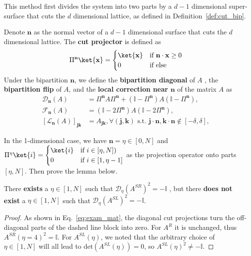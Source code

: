  This method first divides the system into two parts by a $d-1$ dimensional super-surface that cuts the $d$ dimensional lattice, as defined in Definition~\ref{def:cut_bip}.
 \begin{definition}
 \label{def:cut_bip}
      Denote $\mathbf{n}$ as the normal vector of a $d-1$ dimensional surface that cuts the $d$ dimensional lattice. 
      The \textbf{cut projector} is defined as
\begin{align}
    \Pi^{\mathbf{n}}\ket{\mathbf{x}} = \begin{cases}\ket{\mathbf{x}}&\text{if~} \mathbf n \cdot \mathbf x \geq0 \\ 0  &\text{if else} \end{cases}
\end{align}
Under the bipartition $\mathbf{n}$, we define the \textbf{bipartition diagonal} of $A$ , the \textbf{bipartition flip} of $A$, and the \textbf{local correction near $\mathbf{n}$ }of the matrix $A$ as
\begin{align}
    \mathcal{D}_{\mathbf{n}}(A) &= \Pi^{\mathbf{n} }A \Pi^{\mathbf{n} }+ (\mathbb I - \Pi^{\mathbf{n} })A(\mathbb{I} - \Pi^{\mathbf{n} }) ,\\
    \mathcal{F}_{\mathbf{n}}(A) &=  (\mathbb I - 2\Pi^{\mathbf{n} })A(\mathbb{I} - 2\Pi^{\mathbf{n} }) ,\\
     [\mathcal{L}_{\mathbf{n}}(A)]_{\mathbf j\mathbf k} &= A_{\mathbf j\mathbf k},\forall (\mathbf j,\mathbf k) \text{~s.t.~} \mathbf j\cdot \mathbf{n},\mathbf{k} \cdot \mathbf{n} \notin[-\delta , \delta],
\end{align}
 \end{definition}
In the 1-dimensional case, we have $\mathbf{n} = \eta \in [0,N]$ and $\Pi^{\eta }\ket{i} = \begin{cases}\ket{i}&\text{if~} i \in [\eta,N])\\ 0  &\text{if~} i\in [1,\eta-1]\end{cases}$ as the projection operator onto parts $[\eta,N]$. Then prove the lemma below.
\begin{lemma}
\label{lemma:weak_obs}
     There \textbf{exists} a $\eta \in [1,N]$ such that $\mathcal{D}_{\eta}(A^{SR})^2= -\mathbb{I}$ , but there \textbf{does not exist} a $\eta \in [1,N]$ such that $\mathcal{D}_{\eta}(A^{SL})^2 = -\mathbb{I}$.
\end{lemma}
\begin{proof}
    As shown in Eq.~\eqref{eq:exam_mat}, the diagonal cut projections turn the off-diagonal parts of the dashed line block into zero. For $A^R$ it is unchanged, thus  $A^{SR}(\eta = 4)^2 = \mathbb{I} $. For $A^{SL}(\eta)$, we noted that the arbitrary choice of $\eta \in [1,N]$ will all lead to $\text{det}(A^{SL}(\eta)) = 0$,  so $A^{SL}(\eta)^2 \neq -\mathbb{I}$.   
\end{proof}

